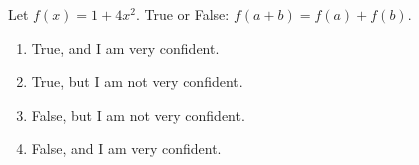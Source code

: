 \bigskip

\item Let $f(x)=1+4x^2$.  True or False:  $f(a+b)=f(a)+f(b)$.

\begin{enumerate}
\item True, and I am very confident.
\item True, but I am not very confident.
\item False, but I am not very confident.
\item False, and I am very confident.
\end{enumerate}

